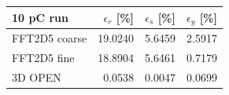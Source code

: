 \begin{tabular}{lrrr}
\toprule
10 pC run & $\epsilon_r$ [\%] & $\epsilon_s$ [\%] & $\epsilon_y$ [\%] \\
\midrule
FFT2D5 coarse & 19.0240 & 5.6459 & 2.5917 \\
FFT2D5 fine & 18.8904 & 5.6461 & 0.7179 \\
3D OPEN & 0.0538 & 0.0047 & 0.0699 \\
\bottomrule
\end{tabular}
